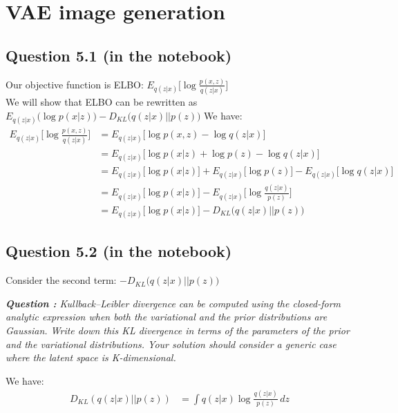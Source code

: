\documentclass{article}
\begin{document}
\section{VAE image generation}
\subsection*{Question 5.1 (in the notebook)}
Our objective function is ELBO: $E_{q(z|x)}\big[\log \frac{p(x,z)}{q(z|x)}\big]$ \\
We will show that ELBO can be rewritten as $E_{q(z|x)}\big(\log p(x|z)\big) - D_{KL} \big( q(z|x) \lvert \rvert  p(z)\big)$
We have:
\begin{align*}
  E_{q(z|x)}\big[\log \frac{p(x,z)}{q(z|x)}\big] & = E_{q(z|x)}\big[\log p(x,z) - \log q(z|x)\big]                                                     \\
                                                 & = E_{q(z|x)}\big[\log p(x|z) + \log p(z) - \log q(z|x)\big]                                         \\
                                                 & = E_{q(z|x)}\big[\log p(x|z)\big] + E_{q(z|x)}\big[\log p(z)\big] - E_{q(z|x)}\big[\log q(z|x)\big] \\
                                                 & = E_{q(z|x)}\big[\log p(x|z)\big] - E_{q(z|x)}\big[\log \frac{q(z|x)}{p(z)}\big]                    \\
                                                 & = E_{q(z|x)}\big[\log p(x|z)\big] - D_{KL} \big( q(z|x) \lvert \rvert  p(z)\big)
\end{align*}

\subsection*{Question 5.2 (in the notebook)}
Consider the second term: $- D_{KL} \big( q(z|x) \lvert \rvert  p(z)\big)$

\textit{\textbf{Question :} Kullback–Leibler divergence can be computed using the closed-form analytic expression when both the variational and the prior distributions are Gaussian. Write down this KL divergence in terms of the parameters of the prior and the variational distributions. Your solution should consider a generic case where the latent space is K-dimensional.}

We have:
\begin{align*}
  D_{KL} \left(q(z|x) \lvert\rvert p(z)\right) & = \int q(z|x) \log \frac{q(z|x)}{p(z)} \,dz
\end{align*}
\end{document}

